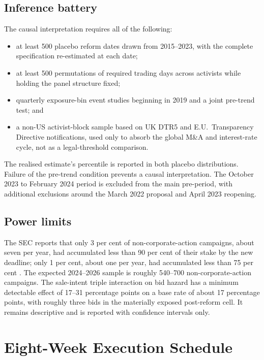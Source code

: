 \subsection{Inference battery}

The causal interpretation requires all of the following:
\begin{itemize}
\item at least 500 placebo reform dates drawn from 2015--2023, with the complete
specification re-estimated at each date;
\item at least 500 permutations of required trading days across activists while
holding the panel structure fixed;
\item quarterly exposure-bin event studies beginning in 2019 and a joint
pre-trend test; and
\item a non-US activist-block sample based on UK DTR5 and E.U.\ Transparency
Directive notifications, used only to absorb the global M\&A and interest-rate
cycle, not as a legal-threshold comparison.
\end{itemize}

The realised estimate's percentile is reported in both placebo distributions.
Failure of the pre-trend condition prevents a causal interpretation. The
October 2023 to February 2024 period is excluded from the main pre-period, with
additional exclusions around the March 2022 proposal and April 2023 reopening.

\subsection{Power limits}

The SEC reports that only 3 per cent of non-corporate-action campaigns, about
seven per year, had accumulated less than 90 per cent of their stake by the new
deadline; only 1 per cent, about one per year, had accumulated less than
75 per cent \parencite{sec2023modernization}. The expected 2024--2026 sample is
roughly 540--700 non-corporate-action campaigns. The sale-intent triple
interaction on bid hazard has a minimum detectable effect of 17--31 percentage
points on a base rate of about 17 percentage points, with roughly three bids in
the materially exposed post-reform cell. It remains descriptive and is reported
with confidence intervals only.

\section{Eight-Week Execution Schedule}
\label{sec:plan-schedule}

